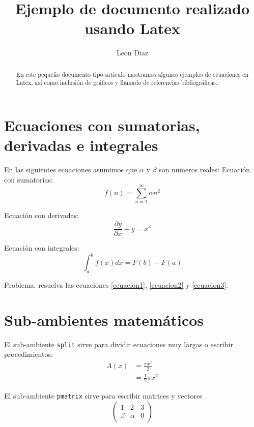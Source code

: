 \documentclass{article}
\title{Ejemplo de documento realizado usando Latex}
\author{Leon Diaz}
\begin{document}
	
	\maketitle
	
	\begin{abstract}
		En este pequeño documento tipo articulo mostramos algunos ejemplos de ecuaciones en Latex, asi como inclusión de gráficos y llamado de referencias bibliográficas.
	\end{abstract}
	
	
	\section{Ecuaciones con sumatorias, derivadas e integrales}
	En las siguientes ecuaciones asumimos que $\alpha$ y $\beta$ son numeros reales:
	Ecuación con sumatorias:
	\begin{equation}\label{ecuacion1}
	f(n) = \sum_{n=1}^{\infty} \alpha n^2   
	\end{equation} 
	
	Ecuación con derivadas:
	\begin{equation}\label{ecuacion2}
	\dfrac{\partial  y}{\partial x } + y = x^3
	\end{equation} 
	
	Ecuación con integrales:
	\begin{equation}\label{ecuacion3}
	\int_{a}^{b} f(x) dx  = F(b)-F(a)
	\end{equation} 
	
	Problema: resuelva las ecuaciones  \ref{ecuacion1}, \ref{ecuacion2} y \ref{ecuacion3}.
	
	\section{Sub-ambientes matemáticos}
	El sub-ambiente \texttt{split} sirve para dividir ecuaciones muy largas o escribir procedimientos:
	\begin{equation} 
	\begin{split} %
	A(x) & = \frac{\pi x^2}{2} \\
	& = \frac{1}{2} \pi x^2
	\end{split}
	\end{equation}
	
	El sub-ambiente \texttt{pmatrix} sirve para escribir matrices y vectores
	\begin{equation} 
	\begin{pmatrix} %
	1 & 2 & 3\\
	\beta & \alpha & 0
	\end{pmatrix} 
	\end{equation} 
	
\end{document}

